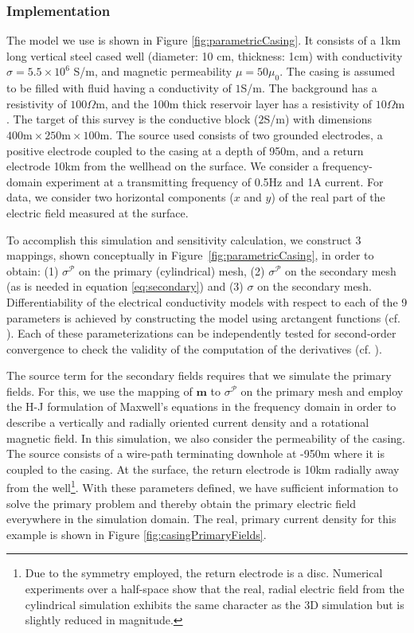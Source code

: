 \documentclass[preprint,review,3p,times,onecolumn,authoryear]{elsarticle}
\begin{document}

\subsubsection{Implementation}
\label{sec:casingImplementation}

The model we use is shown in Figure \ref{fig:parametricCasing}. It  consists of a
1km long vertical steel cased well (diameter: 10 cm, thickness: 1cm) with
conductivity $\sigma= 5.5\times10^6$ S/m, and magnetic permeability $\mu= 50
\mu_0$. The casing is assumed to be filled with fluid having a conductivity of
$1$S/m. The background has a resistivity of $100\Omega \text{m}$, and the 100m
thick reservoir layer has a resistivity of $10\Omega \text{m}$. The target of this
survey is the conductive block ($2$S/m) with dimensions $400 \text{m} \times
250 \text{m} \times 100\text{m}$. The source used consists of two grounded
electrodes, a positive electrode coupled to the casing at a depth of 950m,
and a return electrode 10km from the wellhead on the surface. We consider a
frequency-domain experiment at a transmitting frequency of 0.5Hz and 1A
current. For data, we consider two horizontal components ($x$ and $y$) of the
real part of the electric field measured at the surface.

To accomplish this simulation and sensitivity calculation, we construct 3
mappings, shown conceptually in Figure~\ref{fig:parametricCasing},
in order to obtain: (1) $\sigma^\mathcal{P}$ on the primary (cylindrical) mesh,
(2) $\sigma^\mathcal{P}$ on the secondary mesh (as is needed in equation
\ref{eq:secondary}) and (3) $\sigma$ on the secondary mesh. Differentiability of
the electrical conductivity models with respect to each of the 9 parameters is
achieved by constructing the model using arctangent functions (cf.
\cite{Aghasi2011, McMillan2015}). Each of these parameterizations can be
independently tested for second-order convergence to check the validity of the
computation of the derivatives (cf. \cite{Haber2014a}).

The source term for the secondary fields requires that we simulate the primary
fields. For this, we use the mapping of $\mathbf{m}$ to $\sigma^\mathcal{P}$
on the primary mesh and employ the H-J formulation of Maxwell's equations in
the frequency domain in order to describe a vertically and radially oriented
current density and a rotational magnetic field. In this simulation, we also
consider the permeability of the casing. The source consists of a wire-path
terminating downhole at -950m where it is coupled to the casing. At the
surface, the return electrode is 10km radially away from the well\footnote{Due
to the symmetry employed, the return electrode is a disc. Numerical
experiments over a half-space show that the real, radial electric field from
the cylindrical simulation exhibits the same character as the 3D simulation
but is slightly reduced in magnitude.}. With these parameters defined, we have
sufficient information to solve the primary problem and thereby obtain the
primary electric field everywhere in the simulation domain. The real, primary
current density for this example is shown in Figure
\ref{fig:casingPrimaryFields}.
\end{document}
